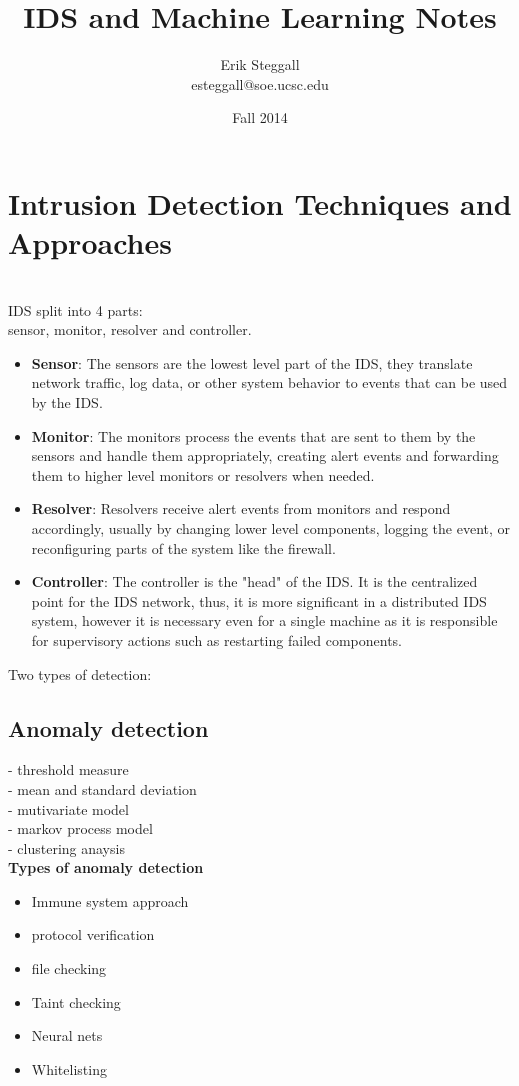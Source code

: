 \documentclass{article}
\title{IDS and Machine Learning Notes}
\author{Erik Steggall \\ esteggall@soe.ucsc.edu}
\date{Fall 2014}
\begin{document}
 \maketitle \pagestyle{empty}
\section*{Intrusion Detection Techniques and Approaches}
 \cite{verwoerd99}\\
IDS split into 4 parts:\\ sensor, monitor, resolver and controller.\\
\begin{itemize}
    \item \textbf{Sensor}: The sensors are the lowest level part of the IDS, they translate network traffic, log data, or other system behavior to events that can be used by the IDS.\\
    \item \textbf{Monitor}: The monitors process the events that are sent to them by the sensors and handle them appropriately, creating alert events and forwarding them to higher level monitors or resolvers when needed.\\
    \item \textbf{Resolver}: Resolvers receive alert events from monitors and respond accordingly, usually by changing lower level components, logging the event, or reconfiguring parts of the system like the firewall.\\
    \item \textbf{Controller}: The controller is the "head" of the IDS. It is the centralized point for the IDS network, thus, it is more significant in a distributed IDS system, however it is necessary even for a single machine as it is responsible for supervisory actions such as restarting failed components.\\
\end{itemize}

Two types of detection: 
\subsection*{Anomaly detection}
- threshold measure\\
- mean and standard deviation\\
- mutivariate model\\
- markov process model\\
- clustering anaysis\\
\textbf{Types of anomaly detection}\\
\begin{itemize}
    \item Immune system approach
    \item protocol verification
    \item file checking
    \item Taint checking
    \item Neural nets
    \item Whitelisting
\end{itemize}
\end{document}
